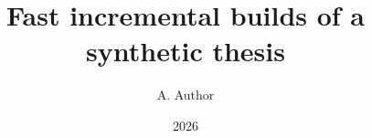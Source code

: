 \documentclass[singlespacing,draft,titlepage=firstiscover,a4paper,11pt,twoside,numbers=noenddot]{scrbook}
\title{Fast incremental builds of a synthetic thesis}
\author{A. Author}
\date{2026}
\begin{document}
\frontmatter
\maketitle
\tableofcontents
\listoffigures
\listoftables
\listofalgorithms
\listoftodos
\printnomenclature
\mainmatter






\appendix


\printbibliography
\end{document}
